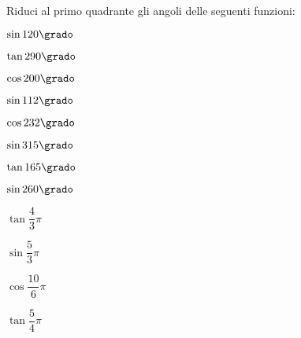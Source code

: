 \begin{esercizio}\label{ese:03.1}
Riduci al primo quadrante gli angoli delle seguenti funzioni:
\begin{multicols}{4}
 \begin{enumeratea}
  \item \(\sin 120 \grado\)
   \hfill
  \item \(\tan 290 \grado\)
   \hfill
  \item \(\cos 200 \grado\) 
   \hfill
  \item \(\sin 112 \grado\) 
   \hfill
  \item \(\cos 232 \grado\) 
   \hfill
  \item \(\sin 315 \grado\) 
   \hfill
  \item \(\tan 165 \grado\) 
   \hfill
  \item \(\sin 260 \grado\) 
   \hfill
  \item \(\tan \dfrac{4}{3}\pi\) 
   \hfill
  \item \(\sin \dfrac{5}{3}\pi\) 
   \hfill
  \item \(\cos \dfrac{10}{6}\pi\) 
   \hfill
  \item \(\tan \dfrac{5}{4}\pi\) 
   \hfill
 \end{enumeratea}
 \end{multicols}
\end{esercizio}

\subsubsection*{}

